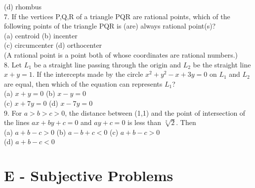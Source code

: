 \documentclass[12pt]{article}
\begin{document}
(d) rhombus\\
7. If the vertices P,Q,R of a triangle PQR are rational points, which of the following points of the triangle PQR is (are) always rational point(s)?\\
(a) centroid \hspace{1cm}   (b)  incenter\\
(c) circumcenter \hspace{1cm} (d) orthocenter\\
(A rational point is a point both of whose coordinates are rational numbers.)\\
8. Let $L_1$ be a straight line passing through the origin and $L_2$ be the straight line $x+y=1$. If the intercepts made by the circle $x^2+y^2-x+3y=0$ on $L_1$ and $L_2$ are equal, then which of the equation can represents $L_1$?\\
(a) $x+y=0$   \hspace{1cm} (b) $x-y=0$ \\ 
(c) $x+7y=0$   \hspace{1cm} (d) $x-7y=0$\\
9. For $a>b>c>0$, the distance between (1,1) and the point of intersection of the lines $ax+by+c=0$ and $ay+c=0$ is less than $\sqrt[2]{2}$. Then\\
(a)  $a+b-c>0$ \hspace{1cm} (b)  $a-b+c<0$\hspace{1cm} (c)  $a+b-c>0$\\
\hspace{1cm}(d)  $a+b-c<0$\\

\section*{E -  Subjective Problems}
\end{document}
